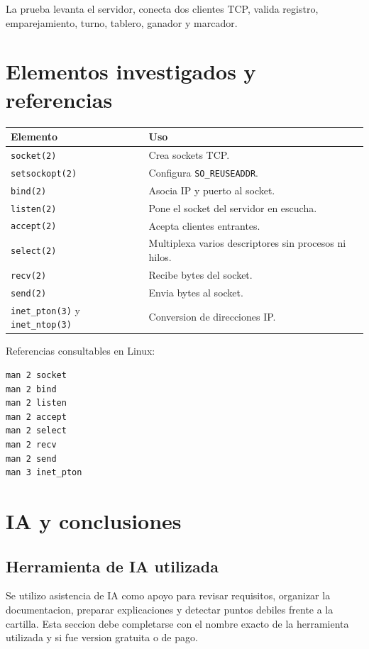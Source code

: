\documentclass[12pt,a4paper]{article}
\begin{document}
La prueba levanta el servidor, conecta dos clientes TCP, valida registro,
emparejamiento, turno, tablero, ganador y marcador.

\section{Elementos investigados y referencias}

\begin{longtable}{|p{4cm}|p{9cm}|}
\hline
\textbf{Elemento} & \textbf{Uso} \\
\hline
\texttt{socket(2)} & Crea sockets TCP. \\
\hline
\texttt{setsockopt(2)} & Configura \texttt{SO\_REUSEADDR}. \\
\hline
\texttt{bind(2)} & Asocia IP y puerto al socket. \\
\hline
\texttt{listen(2)} & Pone el socket del servidor en escucha. \\
\hline
\texttt{accept(2)} & Acepta clientes entrantes. \\
\hline
\texttt{select(2)} & Multiplexa varios descriptores sin procesos ni hilos. \\
\hline
\texttt{recv(2)} & Recibe bytes del socket. \\
\hline
\texttt{send(2)} & Envia bytes al socket. \\
\hline
\texttt{inet\_pton(3)} y \texttt{inet\_ntop(3)} & Conversion de direcciones IP. \\
\hline
\end{longtable}

Referencias consultables en Linux:

\begin{lstlisting}[style=code]
man 2 socket
man 2 bind
man 2 listen
man 2 accept
man 2 select
man 2 recv
man 2 send
man 3 inet_pton
\end{lstlisting}

\section{IA y conclusiones}

\subsection{Herramienta de IA utilizada}

Se utilizo asistencia de IA como apoyo para revisar requisitos, organizar la
documentacion, preparar explicaciones y detectar puntos debiles frente a la
cartilla. Esta seccion debe completarse con el nombre exacto de la herramienta
utilizada y si fue version gratuita o de pago.
\end{document}
